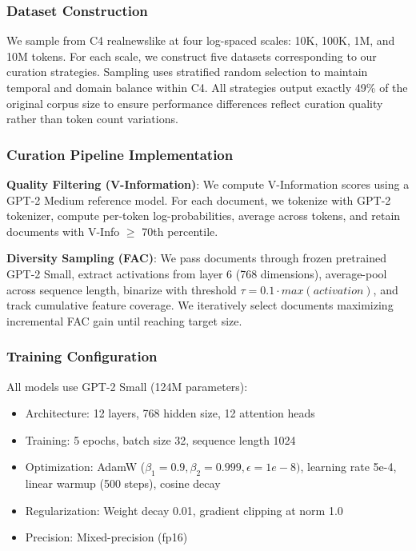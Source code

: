 
\subsubsection{Dataset Construction}

We sample from C4 realnewslike at four log-spaced scales: 10K, 100K, 1M, and 10M tokens. For each scale, we construct five datasets corresponding to our curation strategies. Sampling uses stratified random selection to maintain temporal and domain balance within C4. All strategies output exactly 49\% of the original corpus size to ensure performance differences reflect curation quality rather than token count variations.

\subsubsection{Curation Pipeline Implementation}

\textbf{Quality Filtering (V-Information)}: We compute V-Information scores using a GPT-2 Medium reference model. For each document, we tokenize with GPT-2 tokenizer, compute per-token log-probabilities, average across tokens, and retain documents with V-Info $\geq$ 70th percentile.

\textbf{Diversity Sampling (FAC)}: We pass documents through frozen pretrained GPT-2 Small, extract activations from layer 6 (768 dimensions), average-pool across sequence length, binarize with threshold $\tau =0.1\cdot max(activation)$, and track cumulative feature coverage. We iteratively select documents maximizing incremental FAC gain until reaching target size.

\subsubsection{Training Configuration}

All models use GPT-2 Small (124M parameters):
\begin{itemize}
\item Architecture: 12 layers, 768 hidden size, 12 attention heads
\item Training: 5 epochs, batch size 32, sequence length 1024
\item Optimization: AdamW ($\beta _{1}=0.9, \beta _{2}=0.999, \epsilon =1e-8)$, learning rate 5e-4, linear warmup (500 steps), cosine decay
\item Regularization: Weight decay 0.01, gradient clipping at norm 1.0
\item Precision: Mixed-precision (fp16)
\end{itemize}


